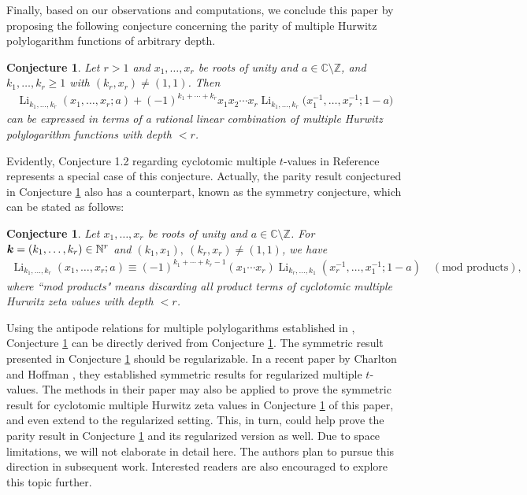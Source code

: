 \documentclass[11pt]{article}
\newcommand{\bfk}{{\boldsymbol{\sl{k}}}}
\DeclareMathOperator{\Li}{Li}
\def\N{\mathbb{N}}
\def\Z{\mathbb{Z}}
\theoremstyle{plain}
\newtheorem{con}[thm]{Conjecture}
\theoremstyle{definition}
\begin{document}
Finally, based on our observations and computations, we conclude this paper by proposing the following conjecture concerning the parity of multiple Hurwitz polylogarithm functions of arbitrary depth.
\begin{con}\label{conjparitycmHZv} Let $r>1$ and $x_1,\ldots,x_r$ be roots of unity and $a\in \mathbb{C}\setminus \Z$, and $k_1,\ldots,k_r\geq 1$ with $(k_r,x_r)\neq (1,1)$. Then
\begin{align*}
\Li_{k_1,\ldots,k_r}(x_1,\ldots,x_r;a)+(-1)^{k_1+\cdots+k_r}x_1x_2\cdots x_r\Li_{k_1,\ldots,k_r}\Big(x^{-1}_1,\ldots,x^{-1}_r;1-a\Big)
\end{align*}
can be expressed in terms of a rational linear combination of multiple Hurwitz polylogarithm functions with depth $< r$.
\end{con}
Evidently, Conjecture 1.2 regarding cyclotomic multiple $t$-values in Reference \cite{Wang-Xu2025} represents a special case of this conjecture.
Actually, the parity result conjectured in Conjecture \ref{conjparitycmHZv} also has a counterpart, known as the symmetry conjecture, which can be stated as follows:
\begin{con}\label{conjsymetrycmHZv}
Let $x_1,\ldots,x_r$ be roots of unity and $a\in \mathbb{C}\setminus \Z$. For $\bfk=(k_1,\ldots,k_r)\in \N^r$ and $(k_1,x_1),\ (k_r,x_r)\neq (1,1)$, we have
\begin{align*}
\Li_{k_1,\ldots,k_r}(x_1,\ldots,x_r;a)\equiv  (-1)^{k_1+\cdots+k_r-1} (x_1\cdots x_r) \Li_{k_r,\ldots,k_1}(x^{-1}_r,\ldots,x_1^{-1};1-a)\quad (\text{mod products}),
\end{align*}
where ``mod products" means discarding all product terms of cyclotomic multiple Hurwitz zeta values with depth $<r$.
\end{con}

Using the antipode relations for multiple polylogarithms established in \cite{XuZhao2020d}, Conjecture \ref{conjsymetrycmHZv} can be directly derived from Conjecture \ref{conjparitycmHZv}.
The symmetric result presented in Conjecture \ref{conjsymetrycmHZv} should be regularizable. In a recent paper by Charlton and Hoffman \cite{CharltonHoffman-MathZ2025}, they established symmetric results for regularized multiple $t$-values. The methods in their paper may also be applied to prove the symmetric result for cyclotomic multiple Hurwitz zeta values in Conjecture \ref{conjsymetrycmHZv} of this paper, and even extend to the regularized setting. This, in turn, could help prove the parity result in Conjecture \ref{conjparitycmHZv}  and its regularized version as well. Due to space limitations, we will not elaborate in detail here. The authors plan to pursue this direction in subsequent work. Interested readers are also encouraged to explore this topic further.
\end{document}
